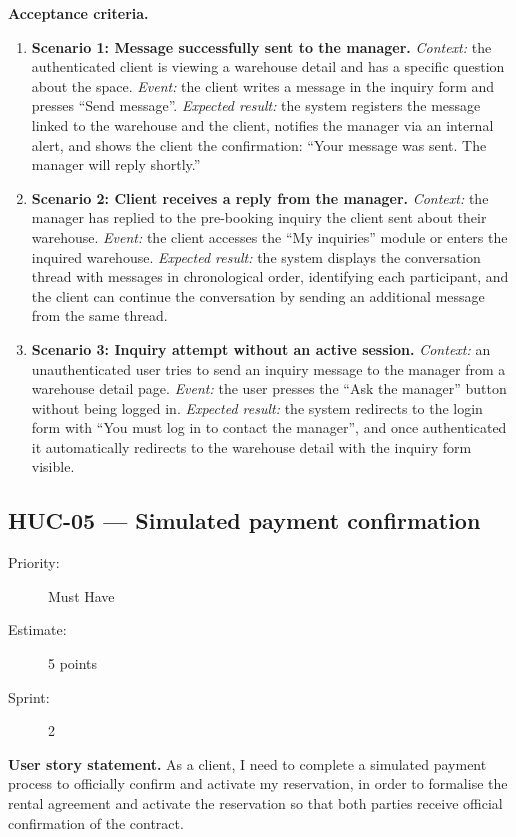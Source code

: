 \documentclass[11pt,a4paper,oneside]{report}
\begin{document}
\textbf{Acceptance criteria.}
\begin{enumerate}
\item \textbf{Scenario 1: Message successfully sent to the manager.} \emph{Context:} the authenticated client is viewing a warehouse detail and has a specific question about the space. \emph{Event:} the client writes a message in the inquiry form and presses ``Send message''. \emph{Expected result:} the system registers the message linked to the warehouse and the client, notifies the manager via an internal alert, and shows the client the confirmation: ``Your message was sent. The manager will reply shortly.''
\item \textbf{Scenario 2: Client receives a reply from the manager.} \emph{Context:} the manager has replied to the pre-booking inquiry the client sent about their warehouse. \emph{Event:} the client accesses the ``My inquiries'' module or enters the inquired warehouse. \emph{Expected result:} the system displays the conversation thread with messages in chronological order, identifying each participant, and the client can continue the conversation by sending an additional message from the same thread.
\item \textbf{Scenario 3: Inquiry attempt without an active session.} \emph{Context:} an unauthenticated user tries to send an inquiry message to the manager from a warehouse detail page. \emph{Event:} the user presses the ``Ask the manager'' button without being logged in. \emph{Expected result:} the system redirects to the login form with ``You must log in to contact the manager'', and once authenticated it automatically redirects to the warehouse detail with the inquiry form visible.
\end{enumerate}

\subsection{HUC-05 --- Simulated payment confirmation}
\label{req:HUC-05}
\begin{description}
\item[Priority:] Must Have \quad \item[Estimate:] 5 points \quad \item[Sprint:] 2
\end{description}

\textbf{User story statement.} As a client, I need to complete a simulated payment process to officially confirm and activate my reservation, in order to formalise the rental agreement and activate the reservation so that both parties receive official confirmation of the contract.
\end{document}

